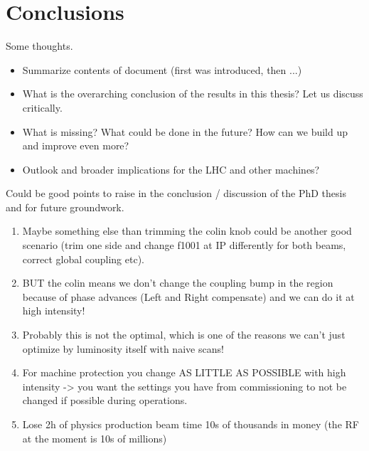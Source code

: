 \chapter{Conclusions}
\label{chapter:conclusion}

Some thoughts.

\begin{itemize}
    \item Summarize contents of document (first was introduced, then ...)
    \item What is the overarching conclusion of the results in this thesis? Let us discuss critically.
    \item What is missing? What could be done in the future? How can we build up and improve even more?
    \item Outlook and broader implications for the LHC and other machines?
\end{itemize}

Could be good points to raise in the conclusion / discussion of the PhD thesis and for future groundwork.

\begin{enumerate}
    \item Maybe something else than trimming the colin knob could be another good scenario (trim one side and change f1001 at IP differently for both beams, correct global coupling etc).
    \item BUT the colin means we don't change the coupling bump in the region because of phase advances (Left and Right compensate) and we can do it at high intensity!
    \item Probably this is not the optimal, which is one of the reasons we can't just optimize by luminosity itself with naive scans!
    \item For machine protection you change AS LITTLE AS POSSIBLE with high intensity -> you want the settings you have from commissioning to not be changed if possible during operations.
    \item Lose 2h of physics production beam time 10s of thousands in money (the RF at the moment is 10s of millions)
\end{enumerate}

\glsresetall                                     %
